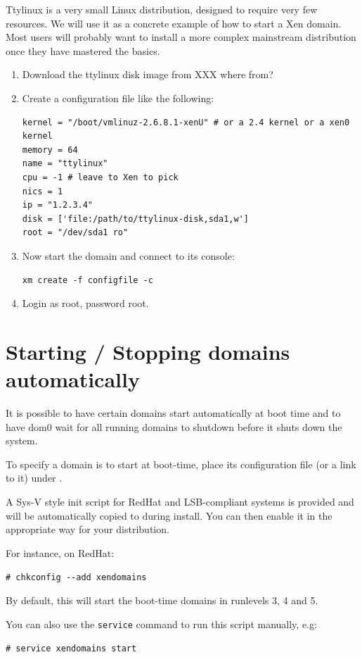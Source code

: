 \documentclass[11pt,twoside,final,openright]{xenstyle}
\begin{document}
Ttylinux is a very small Linux distribution, designed to
require very few resources.  We will use it as a concrete example of
how to start a Xen domain.  Most users will probably want to install a
more complex mainstream distribution once they have mastered the
basics.

\begin{enumerate}
\item Download the ttylinux disk image from XXX where from?
\item Create a configuration file like the following:
\begin{verbatim}
kernel = "/boot/vmlinuz-2.6.8.1-xenU" # or a 2.4 kernel or a xen0 kernel
memory = 64
name = "ttylinux"
cpu = -1 # leave to Xen to pick
nics = 1
ip = "1.2.3.4"
disk = ['file:/path/to/ttylinux-disk,sda1,w']
root = "/dev/sda1 ro"
\end{verbatim}
\item Now start the domain and connect to its console:
\begin{verbatim}
xm create -f configfile -c
\end{verbatim}
\item Login as root, password root.
\end{enumerate}

\section{Starting / Stopping domains automatically}

It is possible to have certain domains start automatically at boot
time and to have dom0 wait for all running domains to shutdown before
it shuts down the system.

To specify a domain is to start at boot-time, place its
configuration file (or a link to it) under .

A Sys-V style init script for RedHat and LSB-compliant systems is
provided and will be automatically copied to 
during install.  You can then enable it in the appropriate way for
your distribution.

For instance, on RedHat:

\verb_# chkconfig --add xendomains_

By default, this will start the boot-time domains in runlevels 3, 4
and 5.

You can also use the {\tt service} command to run this script manually, e.g:

\verb_# service xendomains start_
\end{document}
